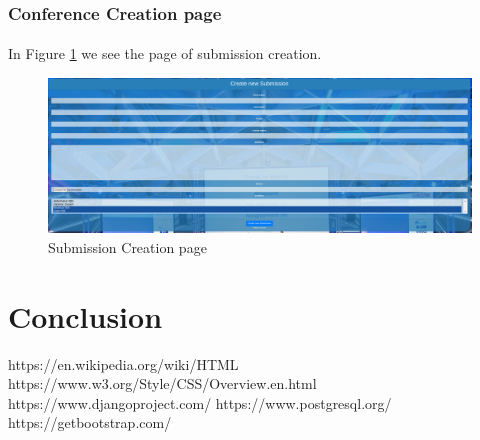 \documentclass[12pt,a4paper]{article}
\begin{document}
	\subsubsection{Conference Creation page}
	\paragraph{}
	In Figure \ref{fig:new-sub} we see the page of submission creation.
	\begin{figure}
		\centering
		\includegraphics[width=\textwidth]{interfaces/new_submission.png}
		\caption{Submission Creation page}
		\label{fig:new-sub}
	\end{figure}
	\clearpage
	\section{Conclusion}
	
	\clearpage
	\begin{thebibliography}{9}
		https://en.wikipedia.org/wiki/HTML
		https://www.w3.org/Style/CSS/Overview.en.html
		https://www.djangoproject.com/
		https://www.postgresql.org/
		https://getbootstrap.com/
	\end{thebibliography}
	
\end{document}
